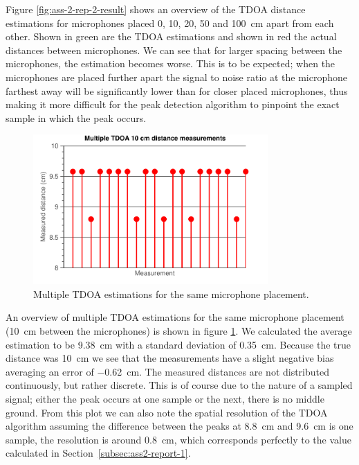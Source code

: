 \documentclass[11pt,titlepage]{report}
\begin{document}
Figure \ref{fig:ass-2-rep-2-result} shows an overview of the TDOA distance estimations for microphones placed \num{0}, \num{10}, \num{20}, \num{50} and \SI{100}{\centi\meter} apart from each other. Shown in green are the TDOA estimations and shown in red the actual distances between microphones. We can see that for larger spacing between the microphones, the estimation becomes worse. This is to be expected; when the microphones are placed further apart the signal to noise ratio at the microphone farthest away will be significantly lower than for closer placed microphones, thus making it more difficult for the peak detection algorithm to pinpoint the exact sample in which the peak occurs.

\begin{figure}[H]
	\centering
	\includegraphics[width=0.8\textwidth]{../../deliverable-7-resources/figures/ass-2/report-2-3/ass-2-report-3.pdf}
	\caption{Multiple TDOA estimations for the same microphone placement.}
	\label{fig:ass-2-rep-3}
\end{figure}

An overview of multiple TDOA estimations for the same microphone placement (\SI{10}{\centi\meter} between the microphones) is shown in figure \ref{fig:ass-2-rep-3}. We calculated the average estimation to be \SI{9.38}{\centi\meter} with a standard deviation of \SI{0.35}{\centi\meter}. Because the true distance was \SI{10}{\centi\meter} we see that the measurements have a slight negative bias averaging an error of \SI{-0.62}{\centi\meter}. The measured distances are not distributed continuously, but rather discrete. This is of course due to the nature of a sampled signal; either the peak occurs at one sample or the next, there is no middle ground. From this plot we can also note the spatial resolution of the TDOA algorithm assuming the difference between the peaks at \SI{8.8}{\centi\meter} and \SI{9.6}{\centi\meter} is one  sample, the resolution is around \SI{0.8}{\centi\meter}, which corresponds perfectly to the value calculated in Section~\ref{subsec:ass2-report-1}.
\end{document}
